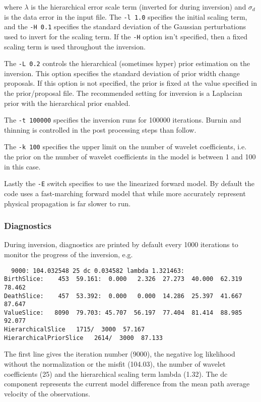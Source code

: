 \documentclass[a4paper,12pt]{article}
\begin{document}
where $\lambda$ is the hierarchical error scale term (inverted for
during inversion) and $\sigma_d$ is the data error in the input
file. The {\tt -l 1.0} specifies the initial scaling term, and the
{\tt -H 0.1} specifies the standard deviation of the Gaussian
perturbations used to invert for the scaling term. If the {\tt -H}
option isn't specified, then a fixed scaling term is used throughout
the inversion.

The {\tt -L 0.2} controls the hierarchical (sometimes hyper) prior estimation
on the inversion. This option specifies the standard deviation of prior
width change proposals. If this option is not specified, the prior is fixed
at the value specified in the prior/proposal file. The recommended
setting for inversion is a Laplacian prior with the hierarchical prior
enabled.

The {\tt -t 100000} specifies the inversion runs for 100000 iterations.
Burnin and thinning is controlled in the post processing steps than follow.

The {\tt -k 100} specifies the upper limit on the number of wavelet
coefficients, i.e. the prior on the number of wavelet coefficients in the
model is between 1 and 100 in this case.

Lastly the {\tt -E} switch specifies to use the linearized forward model.
By default the code uses a fast-marching forward model that while more accurately
represent physical propagation is far slower to run.

\subsubsection{Diagnostics}

During inversion, diagnostics are printed by default every 1000 iterations
to monitor the progress of the inversion, e.g.

\begin{verbatim}
  9000: 104.032548 25 dc 0.034582 lambda 1.321463:
BirthSlice:    453  59.161:  0.000   2.326  27.273  40.000  62.319  78.462 
DeathSlice:    457  53.392:  0.000   0.000  14.286  25.397  41.667  87.647 
ValueSlice:   8090  79.703: 45.707  56.197  77.404  81.414  88.985  92.077
HierarchicalSlice   1715/  3000  57.167
HierarchicalPriorSlice   2614/  3000  87.133
\end{verbatim}

The first line gives the iteration number (9000), the negative log likelihood
without the normalization or the misfit (104.03), the number of wavelet
coefficients (25) and the hierarchical scaling term lambda (1.32). The dc
component represents the current model difference from the mean
path average velocity of the observations.
\end{document}
